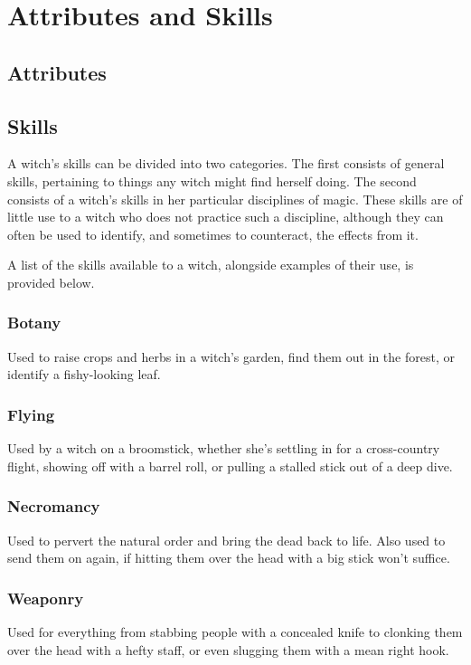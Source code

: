 \chapter{Attributes and Skills}

\section{Attributes}

\section{Skills}



A witch's skills can be divided into two categories.
The first consists of general skills, pertaining to things any witch might find herself doing.
The second consists of a witch's skills in her particular disciplines of magic.
These skills are of little use to a witch who does not practice such a discipline, although they can often be used to identify, and sometimes to counteract, the effects from it.

A list of the skills available to a witch, alongside examples of their use, is provided below.

\subsection{Botany}

Used to raise crops and herbs in a witch's garden, find them out in the forest, or identify a fishy-looking leaf.

\subsection{Flying}

Used by a witch on a broomstick, whether she's settling in for a cross-country flight, showing off with a barrel roll, or pulling a stalled stick out of a deep dive.

\subsection{Necromancy}

Used to pervert the natural order and bring the dead back to life.
Also used to send them on again, if hitting them over the head with a big stick won't suffice.

\subsection{Weaponry}

Used for everything from stabbing people with a concealed knife to clonking them over the head with a hefty staff, or even slugging them with a mean right hook.
